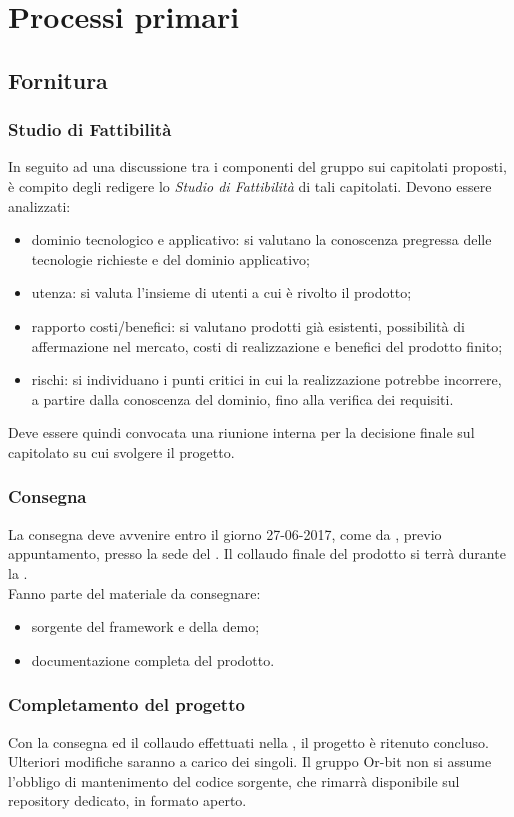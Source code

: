 \section{Processi primari}

\subsection{Fornitura}
\subsubsection{Studio di Fattibilità}
In seguito ad una discussione tra i componenti del gruppo sui capitolati proposti, è compito degli \Analisti{} redigere lo \textit{Studio di Fattibilità} di tali capitolati. Devono essere analizzati:
\begin{itemize}
	\item dominio tecnologico e applicativo: si valutano la conoscenza pregressa delle tecnologie richieste e del dominio applicativo;
	\item utenza: si valuta l'insieme di utenti a cui è rivolto il prodotto;
	\item rapporto costi/benefici: si valutano prodotti già esistenti, possibilità di affermazione nel mercato, costi di realizzazione e benefici del prodotto finito;
	\item rischi: si individuano i punti critici in cui la realizzazione potrebbe incorrere, a partire dalla conoscenza del dominio, fino alla verifica dei requisiti.
\end{itemize}
Deve essere quindi convocata una riunione interna per la decisione finale sul capitolato su cui svolgere il progetto.

\subsubsection{Consegna}
La consegna deve avvenire entro il giorno 27-06-2017, come da \PianoDiProgetto{}, previo appuntamento, presso la sede del \Committente{}. Il collaudo finale del prodotto si terrà durante la \RA{}.\\
Fanno parte del materiale da consegnare:
\begin{itemize}
	\item sorgente del framework e della demo;
	\item documentazione completa del prodotto.
\end{itemize}

\subsubsection{Completamento del progetto}
Con la consegna ed il collaudo effettuati nella \RA{}, il progetto è ritenuto concluso. Ulteriori modifiche saranno a carico dei singoli. Il gruppo Or-bit non si assume l'obbligo di mantenimento del codice sorgente, che rimarrà disponibile sul repository dedicato, in formato aperto.

